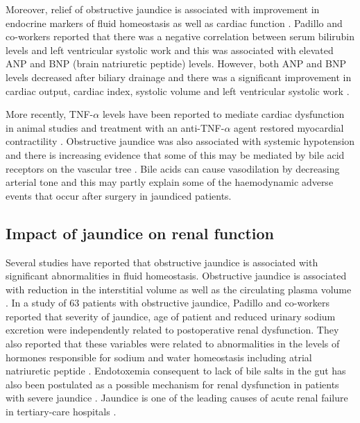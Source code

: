 Moreover, relief of obstructive jaundice is associated with improvement in endocrine markers of fluid homeostasis as well as cardiac function \parencite{padillo_improved_2001, gallardo_increased_1998}. 
Padillo and co-workers reported that there was a negative correlation between serum bilirubin levels and left ventricular systolic work and this was associated with elevated ANP and BNP (brain natriuretic peptide) levels. 
However, both ANP and BNP levels decreased after biliary drainage and there was a significant improvement in cardiac output, cardiac index, systolic volume and left ventricular systolic work \parencite{padillo_improved_2001}. 
	
More recently, TNF-$\alpha$ levels have been reported to mediate cardiac dysfunction in animal studies and treatment with an anti-TNF-$\alpha$ agent restored myocardial contractility \parencite{yang_mechanisms_2010}. 
Obstructive jaundice was also associated with systemic hypotension and there is increasing evidence that some of this may be mediated by bile acid receptors on the vascular tree \parencite{green_systemic_1995, lefebvre_role_2009}. 
Bile acids can cause vasodilation by decreasing arterial tone and this may partly explain some of the haemodynamic adverse events that occur after surgery in jaundiced patients.

\subsection{Impact of jaundice on renal function}

Several studies have reported that obstructive jaundice is associated with significant abnormalities in fluid homeostasis. 
Obstructive jaundice is associated with reduction in the interstitial volume as well as the circulating plasma volume \parencite{sitges-serra_body_1992, padillo_preoperative_1999}. 
In a study of 63 patients with obstructive jaundice, Padillo and co-workers reported that severity of jaundice, age of patient and reduced urinary sodium excretion were independently related to postoperative renal dysfunction. 
They also reported that these variables were related to abnormalities in the levels of hormones responsible for sodium and water homeostasis including atrial natriuretic peptide \parencite{padillo_multivariate_2005}. 
Endotoxemia consequent to lack of bile salts in the gut has also been postulated as a possible mechanism for renal dysfunction in patients with severe jaundice \parencite{bailey_endotoxin_1976}. 
Jaundice is one of the leading causes of acute renal failure in tertiary-care hospitals \parencite{liano_epidemiology_1996}. 

